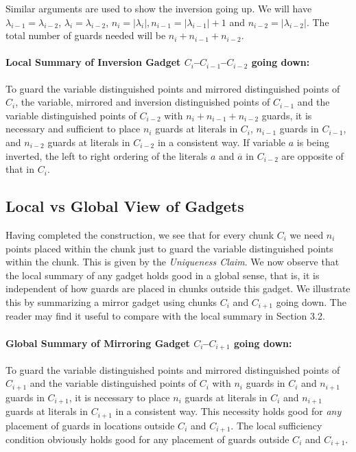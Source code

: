 \documentclass[11pt]{article}
\begin{document}
Similar arguments are used to show the inversion going up.  We will have $\lambda_{i-1} = \lambda_{i-2}$, $\lambda_i = \lambda_{i-2}$, $n_i = | \lambda_i |, n_{i-1} = | \lambda_{i-1} | + 1$ and $n_{i-2} = | \lambda_{i-2} |$.  The total number of guards needed will be $n_i + n_{i-1} + n_{i-2}$.  



\paragraph{Local Summary of Inversion Gadget $C_i$--$C_{i-1}$--$C_{i-2}$ going down:}  To guard the variable distinguished points and mirrored distinguished points of $C_i$, the variable, mirrored and inversion distinguished points of $C_{i-1}$ and the variable distinguished points of $C_{i-2}$ with $n_i + n_{i-1} + n_{i-2}$ guards, it is necessary and sufficient to place $n_i$ guards at literals in $C_i$, $n_{i-1}$ guards in $C_{i-1}$, and $n_{i-2}$ guards at literals in $C_{i-2}$ in a consistent way.  If variable $a$ is being inverted, the left to right ordering of the literals $a$ and $\overline{a}$ in $C_{i-2}$ are opposite of that in $C_i$.







\subsection{Local vs Global View of Gadgets}

Having completed the construction, we see that for every chunk $C_i$ we need $n_i$ points placed within the chunk just to guard the variable distinguished points within the chunk.  This is given by the {\em Uniqueness Claim}.  We now observe that the local summary of any gadget holds good in a global sense, that is, it is independent of how guards are placed in chunks outside this gadget.  We illustrate this by summarizing a mirror gadget using chunks $C_i$ and $C_{i+1}$ going down.  The reader may find it useful to compare with the local summary in Section 3.2.

\paragraph{Global Summary of Mirroring Gadget $C_i$--$C_{i+1}$ going down:}  To guard the variable distinguished points and mirrored distinguished points of $C_{i+1}$ and the variable distinguished points of $C_i$ with $n_i$ guards in $C_i$ and $n_{i+1}$ guards in $C_{i+1}$, it is necessary to place $n_i$ guards at literals in $C_i$ and $n_{i+1}$ guards at literals in $C_{i+1}$ in a consistent way.  This necessity holds good for {\em any} placement of guards in locations outside $C_i$ and $C_{i+1}$.  The local sufficiency condition obviously holds good for any placement of guards outside $C_i$ and $C_{i+1}$.
\end{document}
